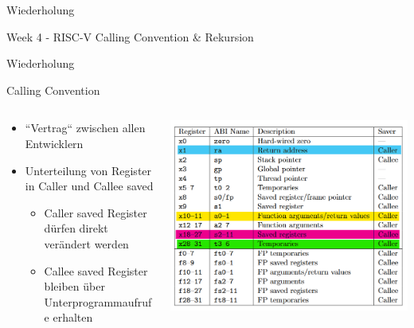 \documentclass[
  german,            %
  aspectratio=169,    %
]{tumbeamer}
\begin{document}
\begin{frame}[c]{}{}
	\begin{center}
	  \LARGE Wiederholung
	\end{center}
\end{frame}

\begin{frame}[c]{Week 4 - RISC-V Calling Convention \& Rekursion}{}
	\begin{center}
	  \LARGE Wiederholung
	\end{center}
\end{frame}

\begin{frame}[c]{Calling Convention}
	\begin{columns}[c]
	  \begin{column}{0.5\textwidth}
		\begin{itemize}
		  \item ``Vertrag`` zwischen allen Entwicklern
		  \item Unterteilung von Register in Caller und Callee saved
		  \begin{itemize}
			\item Caller saved Register dürfen direkt verändert werden
			\item Callee saved Register bleiben über Unterprogrammaufrufe erhalten
		  \end{itemize} 
		\end{itemize}
	  \end{column}
	  \begin{column}{0.5\textwidth}
		\includegraphics[width=\linewidth]{w03_calling_conv_regs.png}
	  \end{column}
	\end{columns}
  \end{frame}
  
\end{document}

